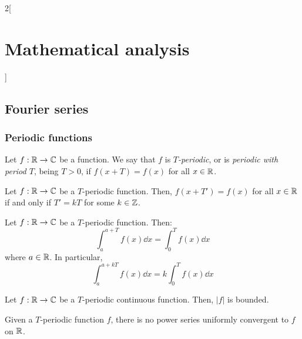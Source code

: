 \documentclass[../../../main.tex]{subfiles}
\begin{document}
\begin{multicols}{2}[\section{Mathematical analysis}]
  \subsection{Fourier series}
  \subsubsection{Periodic functions}
  \begin{definition}
    Let $f:\mathbb{R} \rightarrow\mathbb{C} $ be a function. We say that $f$ is \emph{$T$-periodic}, or is \emph{periodic with period $T$}, being $T>0$, if $f(x+T)=f(x)$ for all $x\in\mathbb{R} $.
  \end{definition}
  \begin{lemma}
    Let $f:\mathbb{R} \rightarrow\mathbb{C} $ be a $T$-periodic function. Then, $f(x+T')=f(x)$ for all $x\in\mathbb{R} $ if and only if $T'=kT$ for some $k\in\mathbb{Z} $.
  \end{lemma}
  \begin{proposition}
    Let $f:\mathbb{R} \rightarrow\mathbb{C} $ be a $T$-periodic function. Then: $$\int_a^{a+T}f(x)\dd{x}=\int_0^Tf(x)\dd{x}$$ where $a\in\mathbb{R} $. In particular, $$\int_a^{a+kT}f(x)\dd{x}=k\int_0^Tf(x)\dd{x}$$
  \end{proposition}
  \begin{lemma}
    Let $f:\mathbb{R} \rightarrow\mathbb{C} $ be a $T$-periodic continuous function. Then, $|f|$ is bounded.
  \end{lemma}
  \begin{proposition}
    Given a $T$-periodic function $f$, there is no power series uniformly convergent to $f$ on $\mathbb{R} $.
  \end{proposition}

\end{multicols}
\end{document}
